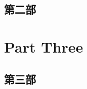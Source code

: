 \documentclass[11pt,fleqn]{book} %
\begin{document}

\chapter{ 第二部}



\part{Part Three}




\chapter{ 第三部}














\end{document}
